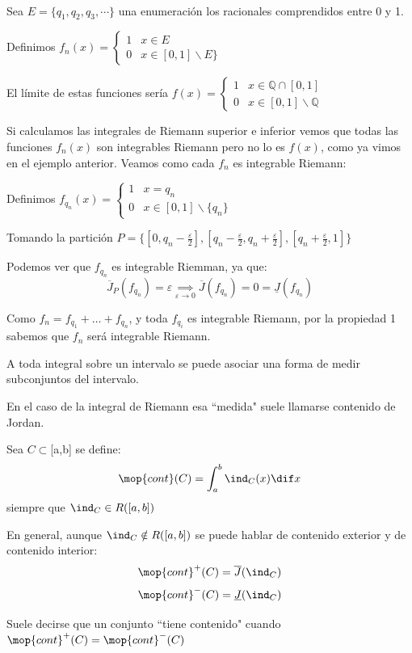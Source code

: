 \documentclass{apuntes}
\begin{document}
\begin{example} $ $

Sea $E = \lbrace q_1, q_2, q_3, \cdots \rbrace$ una enumeración los racionales comprendidos entre 0 y 1.

Definimos $f_n(x)=
\begin{cases}
   1 &  x \in E \\
   0       &  x \in [0,1] \backslash E \rbrace
\end{cases}$

El límite de estas funciones sería $f(x)=
\begin{cases}
   1 &  x \in \mathbb{Q} \cap [0,1] \\
   0       &  x \in [0,1] \backslash \mathbb{Q}
\end{cases}$

Si calculamos las integrales de Riemann superior e inferior vemos que todas las funciones $f_n(x)$ son integrables Riemann pero no lo es $f(x)$, como ya vimos en el ejemplo anterior.
 Veamos como cada $f_n$ es integrable Riemann:


Definimos $f_{q_n}(x) =
\begin{cases}
	1 & x = q_n\\
	0 & x \in [0,1] \backslash \{q_n\}
\end{cases}$

Tomando la partición
$P = \{ [0, q_n - \frac{\varepsilon}{2}], [q_n - \frac{\varepsilon}{2}, q_n + \frac{\varepsilon}{2}], [q_n + \frac{\varepsilon}{2}, 1] \}$


Podemos ver que $f_{q_n}$ es integrable Riemman, ya que:
\[ \overline{J}_P (f_{q_n}) =
\varepsilon \underset{\varepsilon \rightarrow 0}{\implies} \overline{J} (f_{q_n}) = 0 = \underline{J} (f_{q_n}) \]

Como $f_n = f_{q_1} + \ldots + f_{q_n}$, y toda $ f_{q_i}$ es integrable Riemann, por la propiedad 1 sabemos que $f_n$ será integrable Riemann.
\end{example}

\begin{defn}[Contenido]
A toda integral sobre un intervalo se puede asociar una forma de medir subconjuntos del intervalo.

En el caso de la integral de Riemann esa ``medida" suele llamarse contenido de Jordan.

Sea $C\subset$[a,b] se define:
\[\mop{cont}(C) = \int_a^b \ind_{C}(x) \dif x\]
siempre que $\ind_C \in R([a,b])$

En general, aunque $\ind_C \notin R([a,b])$ se puede hablar de contenido exterior y de contenido interior:
\[\mop{cont}^+(C)=\overline{J}(\ind_C)\]
\[\mop{cont}^-(C)=\underline{J}(\ind_C)\]

Suele decirse que un conjunto ``tiene contenido" cuando $\mop{cont}^+(C)=\mop{cont}^-(C)$
\end{defn}
\end{document}

